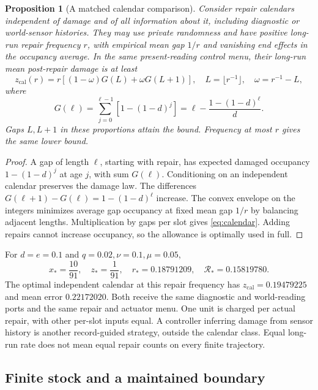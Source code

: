 \documentclass[11pt,a4paper]{article}
\newtheorem{proposition}[definition]{Proposition}
\begin{document}
\begin{proposition}[A matched calendar comparison]\label{prop:calendar}
Consider repair calendars independent of damage and of all information
about it, including diagnostic or world-sensor histories. They may use
private randomness and have positive long-run repair frequency \(r\),
with empirical mean gap \(1/r\) and vanishing end effects in the
occupancy average. In the same present-reading control menu, their
long-run mean post-repair damage is at least
\begin{equation}\label{eq:calendar}
z_{\mathrm{cal}}(r)=r[(1-\omega)G(L)+\omega G(L+1)],
\quad L=\lfloor r^{-1}\rfloor,\quad \omega=r^{-1}-L,
\end{equation}
where
\[
G(\ell)=\sum_{j=0}^{\ell-1}[1-(1-d)^j]
=\ell-\frac{1-(1-d)^\ell}{d}.
\]
Gaps \(L,L+1\) in these proportions attain the bound.
Frequency at most \(r\) gives the same lower bound.
\end{proposition}
\begin{proof}
A gap of length \(\ell\), starting with repair, has expected damaged
occupancy \(1-(1-d)^j\) at age \(j\), with sum \(G(\ell)\).
Conditioning on an independent calendar preserves the damage law.
The differences \(G(\ell+1)-G(\ell)=1-(1-d)^\ell\) increase.
The convex envelope on the integers minimizes average gap occupancy
at fixed mean gap \(1/r\) by balancing adjacent lengths.
Multiplication by gaps per slot gives \eqref{eq:calendar}.
Adding repairs cannot increase occupancy, so the allowance is
optimally used in full.
\end{proof}

For \(d=e=0.1\) and \(q=0.02,\nu=0.1,\mu=0.05\),
\[
x_*=\frac{10}{91},\quad z_*=\frac1{91},\quad
r_*=0.18791209,\quad \mathcal R_*=0.15819780.
\]
The optimal independent calendar at this repair frequency has
\(z_{\mathrm{cal}}=0.19479225\) and mean error \(0.22172020\).
Both receive the same diagnostic and world-reading ports and the same
repair and actuator menu. One unit is charged per actual repair,
with other per-slot inputs equal. A controller inferring damage
from sensor history is another record-guided strategy, outside the
calendar class. Equal long-run rate does not mean equal repair
counts on every finite trajectory.

\subsection{Finite stock and a maintained boundary}\label{subsec:stock}
\end{document}
